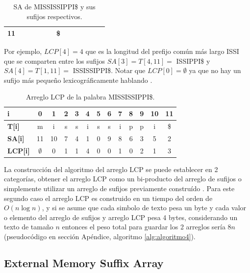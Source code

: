 \begin{table}[!htb]
\begin{tabular}{|l|l|l|l|l|l|l|l|l|l|l|l|l|}
\textbf{11}                                                      &                         &                         &                        &                        &                        & \$                      &                        &                        &                        &                        &                         &                         \\ \hline
\end{tabular}
\caption{SA de MISSISSIPPI\$ y sus sufijos respectivos.}
\end{table}

Por ejemplo, $LCP[4] = 4$ que es la longitud del prefijo común más largo ISSI que se comparten entre los sufijos $SA[3] = T[4,11] =$ ISSIPPI\$ y $SA[4] = T[1,11] =$ ISSISSIPPI\$. Notar que $LCP[0] = \emptyset$ ya que no hay un sufijo más pequeño lexicográficamente hablando \cite{lcparray}.

\begin{table}[!htb]
\centering
\label{my-label11}
\begin{tabular}{|l|c|c|c|c|c|c|c|c|c|c|c|c|}
\hline
\textbf{i}         & 0  & 1  & 2 & 3 & 4 & 5 & 6 & 7 & 8 & 9 & 10 & 11 \\ \hline
\textbf{T{[}i{]}}  & m  & i  & s & s & i & s & s & i & p & p & i  & \$  \\ \hline
\textbf{SA{[}i{]}} & 11 & 10 & 7 & 4 & 1 & 0 & 9 & 8 & 6 & 3 & 5  & 2  \\ \hline
\textbf{LCP{[}i{]}} & $\emptyset$  & 0  & 1 & 1 & 4 & 0 & 0 & 1 & 0 & 2 & 1  & 3  \\ \hline
\end{tabular}
\caption{Arreglo LCP de la palabra MISSISSIPPI\$.}
\end{table}

La construcción del algoritmo del arreglo LCP se puede establecer en 2 categorías, obtener el arreglo LCP como un bi-producto del arreglo de sufijos \cite{suffixarray1} o simplemente utilizar un arreglo de sufijos previamente construído \cite{kasai}. Para este segundo caso el arreglo LCP es construido en un tiempo del orden de $O(n \log n)$, y si se asume que cada simbolo de texto pesa un byte y cada valor o elemento del arreglo de sufijos y arreglo LCP pesa 4 bytes, considerando un texto de tamaño $n$ entonces el peso total para guardar los 2 arreglos sería $8n$ (pseudocódigo en sección Apéndice, algoritmo \ref{alg:algoritmo4}).


\subsection{External Memory Suffix Array}

